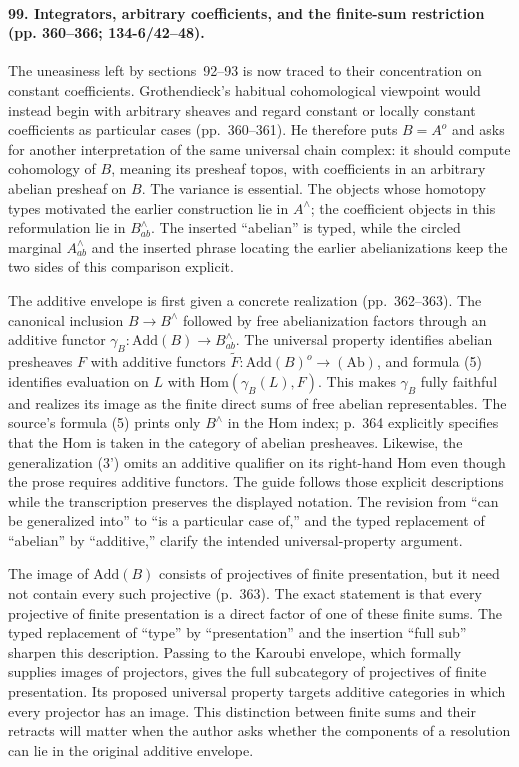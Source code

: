 \paragraph{99. Integrators, arbitrary coefficients, and the finite-sum restriction (pp. 360--366; 134-6/42--48).}
The uneasiness left by sections~92--93 is now traced to their concentration on constant coefficients. Grothendieck's habitual cohomological viewpoint would instead begin with arbitrary sheaves and regard constant or locally constant coefficients as particular cases (pp.~360--361). He therefore puts $B=A^o$ and asks for another interpretation of the same universal chain complex: it should compute cohomology of $B$, meaning its presheaf topos, with coefficients in an arbitrary abelian presheaf on $B$. The variance is essential. The objects whose homotopy types motivated the earlier construction lie in $A^{\wedge}$; the coefficient objects in this reformulation lie in $B^{\wedge}_{ab}$. The inserted ``abelian'' is typed, while the circled marginal $A^{\wedge}_{ab}$ and the inserted phrase locating the earlier abelianizations keep the two sides of this comparison explicit.

The additive envelope is first given a concrete realization (pp.~362--363). The canonical inclusion $B\to B^{\wedge}$ followed by free abelianization factors through an additive functor $\gamma_B:\mathrm{Add}(B)\to B^{\wedge}_{ab}$. The universal property identifies abelian presheaves $F$ with additive functors $\widetilde F:\mathrm{Add}(B)^o\to(\mathrm{Ab})$, and formula (5) identifies evaluation on $L$ with $\mathrm{Hom}(\gamma_B(L),F)$. This makes $\gamma_B$ fully faithful and realizes its image as the finite direct sums of free abelian representables. The source's formula (5) prints only $B^{\wedge}$ in the Hom index; p.~364 explicitly specifies that the Hom is taken in the category of abelian presheaves. Likewise, the generalization (3') omits an additive qualifier on its right-hand Hom even though the prose requires additive functors. The guide follows those explicit descriptions while the transcription preserves the displayed notation. The revision from ``can be generalized into'' to ``is a particular case of,'' and the typed replacement of ``abelian'' by ``additive,'' clarify the intended universal-property argument.

The image of $\mathrm{Add}(B)$ consists of projectives of finite presentation, but it need not contain every such projective (p.~363). The exact statement is that every projective of finite presentation is a direct factor of one of these finite sums. The typed replacement of ``type'' by ``presentation'' and the insertion ``full sub'' sharpen this description. Passing to the Karoubi envelope, which formally supplies images of projectors, gives the full subcategory of projectives of finite presentation. Its proposed universal property targets additive categories in which every projector has an image. This distinction between finite sums and their retracts will matter when the author asks whether the components of a resolution can lie in the original additive envelope.

